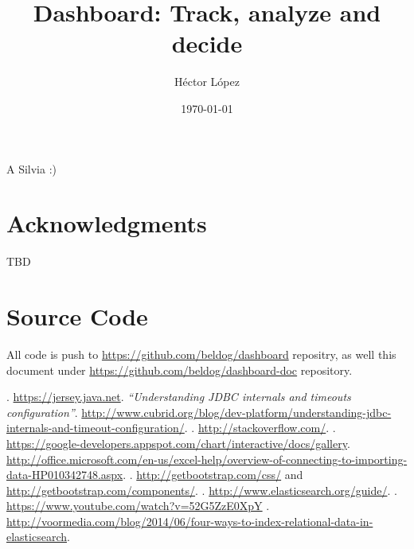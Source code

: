 \documentclass[a4paper,12pt,english]{book}
\newenvironment{dedication}
{
   \cleardoublepage
   \thispagestyle{empty}
   \vspace*{\stretch{1}}
   \hfill\begin{minipage}[t]{0.15\textwidth}
   \raggedright
}%
{
   \end{minipage}
   \vspace*{\stretch{3}}
   \clearpage
}
\begin{document}
\title{Dashboard: Track, analyze and decide}
\author{Héctor López}

\date{\today}
\maketitle

\begin{dedication}
A Silvia :)
\end{dedication}

%

\tableofcontents

\chapter*{Acknowledgments}

TBD \\

\chapter*{Source Code}
All code is push to \url{https://github.com/beldog/dashboard} repositry, as well
this document under \url{https://github.com/beldog/dashboard-doc} repository.

%
%




%
%


\begin{thebibliography}{1}

	. \url{https://jersey.java.net}.
	\bibitem{}{} 
		{\em ``Understanding JDBC internals and timeouts configuration''}.
		\url{http://www.cubrid.org/blog/dev-platform/understanding-jdbc-internals-and-timeout-configuration/}.
	. \url{http://stackoverflow.com/}.
	.
	\url{https://google-developers.appspot.com/chart/interactive/docs/gallery}.
	\url{http://office.microsoft.com/en-us/excel-help/overview-of-connecting-to-importing-data-HP010342748.aspx}.
	. \url{http://getbootstrap.com/css/}
	and \url{http://getbootstrap.com/components/}.
	.	\url{http://www.elasticsearch.org/guide/}.
	.
	\url{https://www.youtube.com/watch?v=52G5ZzE0XpY}
	.
	\url{http://voormedia.com/blog/2014/06/four-ways-to-index-relational-data-in-elasticsearch}.
\end{thebibliography}
\end{document}
